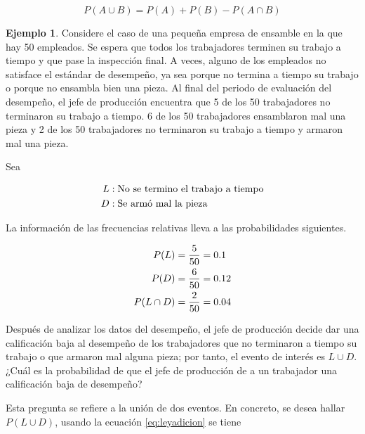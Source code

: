 \documentclass[
]{book}
\theoremstyle{definition}
\theoremstyle{definition}
\newtheorem{example}{Ejemplo}[chapter]
\theoremstyle{definition}
\theoremstyle{definition}
\theoremstyle{remark}
\begin{document}
\begin{enumerate}
  \begin{equation}
  P(A\cup B) = P(A) + P(B) - P(A\cap B)
  \label{eq:leyadicion}
  \end{equation}

  \begin{example}
  Considere el caso de una pequeña empresa de ensamble en la que hay 50 empleados. Se espera que todos los trabajadores terminen su trabajo a tiempo y que pase la inspección final. A veces, alguno de los empleados no satisface el estándar de desempeño, ya sea porque no termina a tiempo su trabajo o porque no ensambla bien una pieza. Al final del periodo de evaluación del desempeño, el jefe de producción encuentra que 5 de los 50 trabajadores no terminaron su trabajo a tiempo. 6 de los 50 trabajadores ensamblaron mal una pieza y 2 de los 50 trabajadores no terminaron su trabajo a tiempo y armaron mal una pieza.

  Sea

  \begin{equation}
  \notag
  \begin{split}
  L &: \text{No se termino el trabajo a tiempo}\\
  D &: \text{Se armó mal la pieza}\\
  \end{split}
  \end{equation}

  La información de las frecuencias relativas lleva a las probabilidades siguientes.

  \begin{equation}
  \notag
  \begin{split}
  P(L) &= \frac{5}{50} = 0.1\\
  P(D) &= \frac{6}{50} = 0.12\\
  P(L\cap D) &= \frac{2}{50} = 0.04\\
  \end{split}
  \end{equation}

  Después de analizar los datos del desempeño, el jefe de producción decide dar una calificación baja al desempeño de los trabajadores que no terminaron a tiempo su trabajo o que armaron mal alguna pieza; por tanto, el evento de interés es \(L \cup D\). ¿Cuál es la probabilidad de que el jefe de producción de a un trabajador una calificación baja de desempeño?

  Esta pregunta se refiere a la unión de dos eventos. En concreto, se desea hallar \(P(L\cup D)\), usando la ecuación \eqref{eq:leyadicion} se tiene


\end{example}
\end{enumerate}
\end{document}

